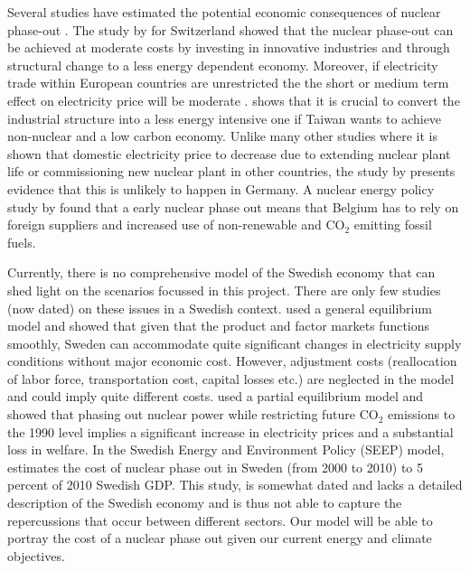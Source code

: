 Several studies have estimated the potential economic consequences of nuclear phase-out \citep{Bohringer2002, Nestle2012, Bretschger2012, Duscha0, Glomsrod2013, Kunsch2014}. The study by \cite{Bretschger2012} for Switzerland showed that the nuclear phase-out can be achieved at moderate costs by investing in innovative industries and through structural change to a less energy dependent economy. Moreover, if electricity trade within European countries are unrestricted the the short or medium term effect on electricity price will be moderate \citep{Glomsrod2013}. \cite{Chen2013} shows that it is crucial to convert the industrial structure into a less energy intensive one if Taiwan wants to achieve non-nuclear and a low carbon economy. Unlike many other studies where it is shown that domestic electricity price to decrease due to extending nuclear plant life or commissioning new nuclear plant in other countries, the study by \citep{Nestle2012} presents evidence that this is unlikely to happen in Germany. A nuclear energy policy study by \cite{Kunsch2014} found that a early nuclear phase out means that Belgium has to rely on foreign suppliers and increased use of non-renewable and CO$_2$ emitting fossil fuels.

Currently, there is no comprehensive model of the Swedish economy that can shed light on the scenarios focussed in this project. There are only few studies (now dated) on these issues in a Swedish context. \cite{Bergman1981} used a general equilibrium model and showed that given that the product and factor markets functions smoothly, Sweden can accommodate quite significant changes in electricity supply conditions without major economic cost. However, adjustment costs (reallocation of labor force, transportation cost, capital losses etc.) are neglected in the model and could imply quite different costs. \cite{Andersson1997} used a partial equilibrium model and showed that phasing out nuclear power while restricting future CO$_2$ emissions to the 1990 level implies a significant increase in electricity prices and a substantial loss in welfare. In the Swedish Energy and Environment Policy (SEEP) model, \cite{nordhaus1997swedish} estimates the cost of nuclear phase out in Sweden (from 2000 to 2010) to 5 percent of 2010 Swedish GDP. This study, is somewhat dated and lacks a detailed description of the Swedish economy and is thus not able to capture the repercussions that occur between different sectors. Our model will be able to portray the cost of a nuclear phase out given our current energy and climate objectives.

